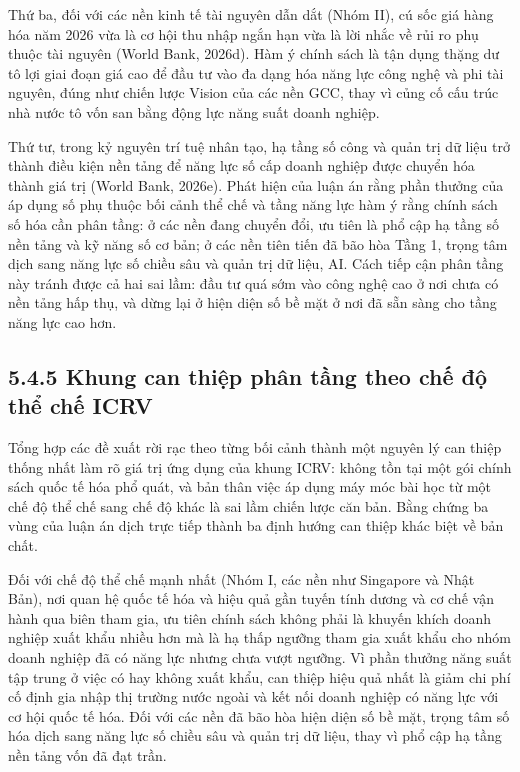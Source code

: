 \documentclass[
  a4paper,
  13pt]{extreport}
\begin{document}
Thứ ba, đối với các nền kinh tế tài nguyên dẫn dắt (Nhóm II), cú sốc giá
hàng hóa năm 2026 vừa là cơ hội thu nhập ngắn hạn vừa là lời nhắc về rủi
ro phụ thuộc tài nguyên (World Bank, 2026d). Hàm ý chính sách là tận
dụng thặng dư tô lợi giai đoạn giá cao để đầu tư vào đa dạng hóa năng
lực công nghệ và phi tài nguyên, đúng như chiến lược Vision của các nền
GCC, thay vì củng cố cấu trúc nhà nước tô vốn san bằng động lực năng
suất doanh nghiệp.

Thứ tư, trong kỷ nguyên trí tuệ nhân tạo, hạ tầng số công và quản trị dữ
liệu trở thành điều kiện nền tảng để năng lực số cấp doanh nghiệp được
chuyển hóa thành giá trị (World Bank, 2026e). Phát hiện của luận án rằng
phần thưởng của áp dụng số phụ thuộc bối cảnh thể chế và tầng năng lực
hàm ý rằng chính sách số hóa cần phân tầng: ở các nền đang chuyển đổi,
ưu tiên là phổ cập hạ tầng số nền tảng và kỹ năng số cơ bản; ở các nền
tiên tiến đã bão hòa Tầng 1, trọng tâm dịch sang năng lực số chiều sâu
và quản trị dữ liệu, AI. Cách tiếp cận phân tầng này tránh được cả hai
sai lầm: đầu tư quá sớm vào công nghệ cao ở nơi chưa có nền tảng hấp
thụ, và dừng lại ở hiện diện số bề mặt ở nơi đã sẵn sàng cho tầng năng
lực cao hơn.

\hypertarget{khung-can-thiux1ec7p-phuxe2n-tux1ea7ng-theo-chux1ebf-ux111ux1ed9-thux1ec3-chux1ebf-icrv}{%
\subsection{5.4.5 Khung can thiệp phân tầng theo chế độ thể chế
ICRV}\label{khung-can-thiux1ec7p-phuxe2n-tux1ea7ng-theo-chux1ebf-ux111ux1ed9-thux1ec3-chux1ebf-icrv}}

Tổng hợp các đề xuất rời rạc theo từng bối cảnh thành một nguyên lý can
thiệp thống nhất làm rõ giá trị ứng dụng của khung ICRV: không tồn tại
một gói chính sách quốc tế hóa phổ quát, và bản thân việc áp dụng máy
móc bài học từ một chế độ thể chế sang chế độ khác là sai lầm chiến lược
căn bản. Bằng chứng ba vùng của luận án dịch trực tiếp thành ba định
hướng can thiệp khác biệt về bản chất.

Đối với chế độ thể chế mạnh nhất (Nhóm I, các nền như Singapore và Nhật
Bản), nơi quan hệ quốc tế hóa và hiệu quả gần tuyến tính dương và cơ chế
vận hành qua biên tham gia, ưu tiên chính sách không phải là khuyến
khích doanh nghiệp xuất khẩu nhiều hơn mà là hạ thấp ngưỡng tham gia
xuất khẩu cho nhóm doanh nghiệp đã có năng lực nhưng chưa vượt ngưỡng.
Vì phần thưởng năng suất tập trung ở việc có hay không xuất khẩu, can
thiệp hiệu quả nhất là giảm chi phí cố định gia nhập thị trường nước
ngoài và kết nối doanh nghiệp có năng lực với cơ hội quốc tế hóa. Đối
với các nền đã bão hòa hiện diện số bề mặt, trọng tâm số hóa dịch sang
năng lực số chiều sâu và quản trị dữ liệu, thay vì phổ cập hạ tầng nền
tảng vốn đã đạt trần.
\end{document}
